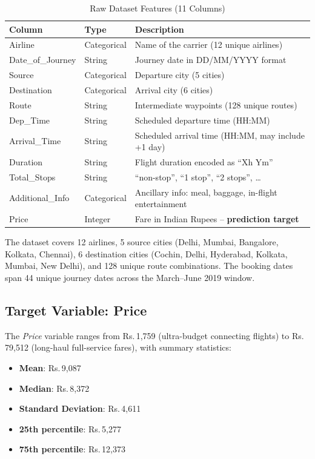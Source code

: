 \documentclass[12pt, a4paper]{article}
\begin{document}
\begin{table}[h]
\caption{Raw Dataset Features (11 Columns)}
\label{tab:raw_features}
\centering
\begin{tabular}{llp{7cm}}
\toprule
\textbf{Column} & \textbf{Type} & \textbf{Description} \\
\midrule
Airline          & Categorical & Name of the carrier (12 unique airlines) \\
Date\_of\_Journey & String     & Journey date in DD/MM/YYYY format \\
Source           & Categorical & Departure city (5 cities) \\
Destination      & Categorical & Arrival city (6 cities) \\
Route            & String      & Intermediate waypoints (128 unique routes) \\
Dep\_Time        & String      & Scheduled departure time (HH:MM) \\
Arrival\_Time    & String      & Scheduled arrival time (HH:MM, may include +1 day) \\
Duration         & String      & Flight duration encoded as ``Xh Ym'' \\
Total\_Stops     & String      & ``non-stop'', ``1 stop'', ``2 stops'', \ldots \\
Additional\_Info & Categorical & Ancillary info: meal, baggage, in-flight entertainment \\
Price            & Integer     & Fare in Indian Rupees -- \textbf{prediction target} \\
\bottomrule
\end{tabular}
\end{table}

The dataset covers 12 airlines, 5 source cities
(Delhi, Mumbai, Bangalore, Kolkata, Chennai), 6 destination cities
(Cochin, Delhi, Hyderabad, Kolkata, Mumbai, New Delhi), and 128 unique route
combinations.  The booking dates span 44 unique journey dates across the
March--June 2019 window.

\subsection{Target Variable: Price}

The \textit{Price} variable ranges from Rs.\,1{,}759 (ultra-budget connecting
flights) to Rs.\,79{,}512 (long-haul full-service fares), with summary
statistics:
\begin{itemize}
    \item \textbf{Mean}: Rs.\,9{,}087
    \item \textbf{Median}: Rs.\,8{,}372
    \item \textbf{Standard Deviation}: Rs.\,4{,}611
    \item \textbf{25th percentile}: Rs.\,5{,}277
    \item \textbf{75th percentile}: Rs.\,12{,}373
\end{itemize}
\end{document}
